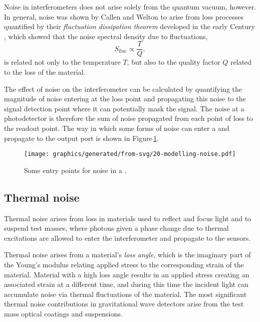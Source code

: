 Noise in interferometers does not arise solely from the quantum vacuum, however. In general, noise was shown by Callen and Welton to arise from loss processes quantified by their \emph{fluctuation dissipation theorem} developed in the early  Century \cite{Callen1951}, which showed that the noise spectral density due to fluctuations,
\begin{equation}
  S_{\text{fluc}} \propto \frac{T}{Q},
\end{equation}
is related not only to the temperature $T$, but also to the quality factor $Q$ related to the loss of the material.

The effect of noise on the interferometer can be calculated by quantifying the magnitude of noise entering at the loss point and propagating this noise to the signal detection point where it can potentially mask the signal. The noise at a photodetector is therefore the sum of noise propagated from each point of loss to the readout point. The way in which some forms of noise can enter a \MI{} and propagate to the output port is shown in Figure\,\ref{fig:modelling-noise}.

\begin{figure}
  \centering
  \texttt{[image: graphics/generated/from-svg/20-modelling-noise.pdf]}
  \caption[Some entry points for noise in a \MI{}]{\label{fig:modelling-noise}Some entry points for noise in a \MI{}.}
\end{figure}

\subsection{Thermal noise}
Thermal noise arises from loss in materials used to reflect and focus light and to suspend test masses, where photons given a phase change due to thermal excitations are allowed to enter the interferometer and propagate to the sensors.

Thermal noise arises from a material's \emph{loss angle}, which is the imaginary part of the Young's modulus relating applied stress to the corresponding strain of the material. Material with a high loss angle results in an applied stress creating an associated strain at a different time, and during this time the incident light can accumulate noise via thermal fluctuations of the material. The most significant thermal noise contributions in gravitational wave detectors arise from the test mass optical coatings and suspensions.

